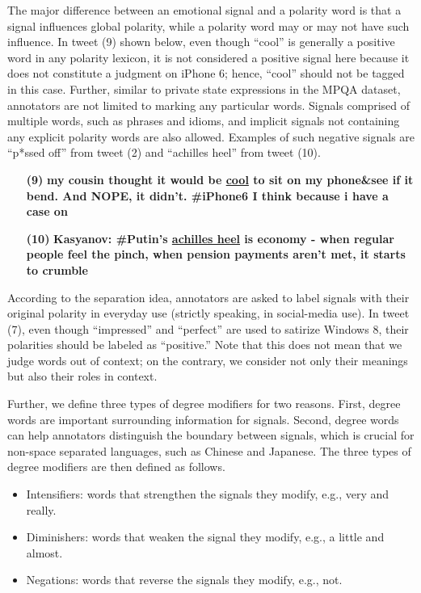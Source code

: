 \documentclass[english]{jnlp_1.4}
\begin{document}
The major difference between an emotional signal and a polarity word is that a signal influences global polarity, while a polarity word may or may not have such influence. In tweet (9) shown below, even though ``cool'' is generally a positive word in any polarity lexicon, it is not considered a positive signal here because it does not constitute a judgment on iPhone 6; hence, ``cool'' should not be tagged in this case. Further, similar to private state expressions in the MPQA dataset, annotators are not limited to marking any particular words. Signals comprised of multiple words, such as phrases and idioms, and implicit signals not containing any explicit polarity words are also allowed. Examples of such negative signals are ``p*ssed off'' from tweet (2) and ``achilles heel'' from tweet (10).

\begin{enumerate}
\item[{\bf (9)}] {\bf my cousin thought it would be \underline{cool} to sit on my phone\&see if it bend. And NOPE, it didn't. \#iPhone6 I think because i have a case on}
\item[{\bf (10)}] {\bf Kasyanov: \#Putin's \underline{achilles heel} is economy - when regular people feel the pinch, when pension payments aren't met, it starts to crumble}
\end{enumerate}

According to the separation idea, annotators are asked to label signals with their original polarity in everyday use (strictly speaking, in social-media use). In tweet (7), even though ``impressed'' and ``perfect'' are used to satirize Windows 8, their polarities should be labeled as ``positive.'' Note that this does not mean that we judge words out of context; on the contrary, we consider not only their meanings but also their roles in context.

Further, we define three types of degree modifiers for two reasons. First, degree words are important surrounding information for signals. Second, degree words can help annotators distinguish the boundary between signals, which is crucial for non-space separated languages, such as Chinese and Japanese. The three types of degree modifiers are then defined as follows. 

\begin{itemize}
\item Intensifiers: words that strengthen the signals they modify, e.g., very and really.
\item Diminishers: words that weaken the signal they modify, e.g., a little and almost.
\item Negations: words that reverse the signals they modify, e.g., not.
\end{itemize}
\end{document}
